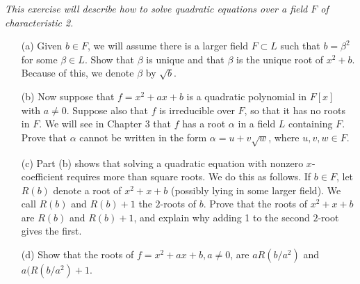 \documentclass[11pt,a4paper]{article}
\begin{document}
{\it This exercise will describe how to solve quadratic equations over a field $F$ of characteristic 2.
\begin{enumerate}
\item[(a)] Given $b \in F$, we will assume there is a larger field $F\subset L$ such that $b=\beta^2$ for some $\beta \in L$.
Show that $\beta$ is unique and that $\beta$ is the unique root of $x^2+b$. Because of this, we denote $\beta$ by $\sqrt{b}$.
\item[(b)] Now suppose that $f = x^2+ax+b$ is a quadratic polynomial in $F[x]$ with $a\ne 0$. Suppose also that $f$ is irreducible over $F$, so that it has no roots in $F$. We will see in Chapter 3 that $f$ has a root $\alpha$ in a field $L$ containing $F$. Prove that $\alpha$ cannot be written in the form $\alpha = u + v \sqrt{w}$, where $u,v,w \in F$.
\item[(c)] Part (b) shows that solving a quadratic equation with nonzero $x$-coefficient requires more than square roots. We do this as follows. If $b\in F$, let $R(b)$ denote a root of $x^2+x+b$ (possibly lying in some larger field). We call $R(b)$ and $R(b)+1$ the $2$-roots of $b$. Prove that the roots of $x^2+x+b$ are $R(b)$ and $R(b)+1$, and explain why adding 1 to the second $2$-root gives the first. 
\item[(d)] Show that the roots of $f = x^2 + ax+b, a\ne 0$, are $aR(b/a^2)$ and $a(R(b/a^2)+1$.
\end{enumerate}
}
\end{document}
